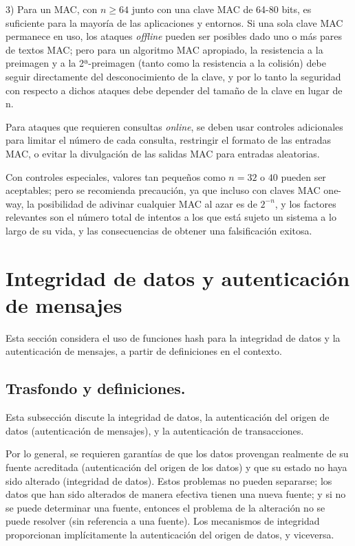 \documentclass[a4paper, 12pt]{article} %
\begin{document}
\newpage

3) Para un MAC, con $n \geq 64$ junto con una clave MAC de 64-80 bits, es suficiente para la mayoría
de las aplicaciones y entornos. Si una sola clave MAC permanece en uso, los ataques \textit{offline} pueden
ser posibles dado uno o más pares de textos MAC; pero para un algoritmo MAC apropiado, la resistencia a la preimagen
y a la 2ª-preimagen (tanto como la resistencia a la colisión) debe seguir directamente del desconocimiento de la
clave, y por lo tanto la seguridad con respecto a dichos ataques debe depender del tamaño de la clave en lugar de n.

Para ataques que requieren consultas \textit{online}, se deben usar controles adicionales para limitar el número
de cada consulta, restringir el formato de las entradas MAC, o evitar la divulgación de las salidas MAC para
entradas aleatorias.

Con controles especiales, valores tan pequeños como $n=32$ o $40$ pueden ser aceptables; pero
se recomienda precaución, ya que incluso con claves MAC one-way, la posibilidad de adivinar cualquier MAC al azar es
de $2^{-n}$, y los factores relevantes son el número total de intentos a los que está sujeto un sistema a lo
largo de su vida, y las consecuencias de obtener una falsificación exitosa.


\newpage
\section{Integridad de datos y autenticación de mensajes}
Esta sección considera el uso de funciones hash para la integridad de datos y la autenticación de mensajes,
a partir de definiciones en el contexto.

\subsection{Trasfondo y definiciones.}
Esta subsección discute la integridad de datos, la autenticación del origen de datos (autenticación de mensajes),
y la autenticación de transacciones.

Por lo general, se requieren garantías de que los datos provengan realmente de su fuente acreditada (autenticación
del origen de los datos) y que su estado no haya sido alterado (integridad de datos).
Estos problemas no pueden separarse; los datos que han sido alterados de manera efectiva tienen una nueva fuente;
y si no se puede determinar una fuente, entonces el problema de la alteración no se puede resolver (sin referencia
a una fuente). Los mecanismos de integridad proporcionan implícitamente la autenticación del origen de datos, y
viceversa.
\end{document}
